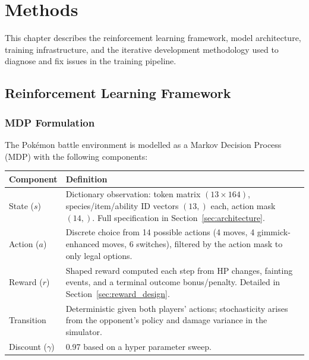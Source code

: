 \chapter{Methods}
\label{ch:methods}

This chapter describes the reinforcement learning framework, model architecture,
training infrastructure, and the iterative development methodology used to
diagnose and fix issues in the training pipeline.

\section{Reinforcement Learning Framework}

\subsection{MDP Formulation}

The Pok\'{e}mon battle environment is modelled as a Markov Decision Process
(MDP) with the following components:

\begin{center}
\small
\begin{tabularx}{\textwidth}{l X}
  \toprule
  \textbf{Component} & \textbf{Definition} \\
  \midrule
  State ($s$)       & Dictionary observation: token matrix $(13 \times 164)$,
                      species/item/ability ID vectors $(13,)$ each, action
                      mask $(14,)$.  Full specification in
                      Section~\ref{sec:architecture}. \\
  Action ($a$)       & Discrete choice from 14 possible actions (4 moves,
                      4 gimmick-enhanced moves, 6 switches), filtered by the
                      action mask to only legal options. \\
  Reward ($r$)       & Shaped reward computed each step from HP changes,
                      fainting events, and a terminal outcome bonus/penalty.
                      Detailed in Section~\ref{sec:reward_design}. \\
  Transition         & Deterministic given both players' actions;
                      stochasticity arises from the opponent's policy and
                      damage variance in the simulator. \\
  Discount ($\gamma$) & 0.97 based on a hyper parameter sweep. \\
  \bottomrule
\end{tabularx}
\end{center}


